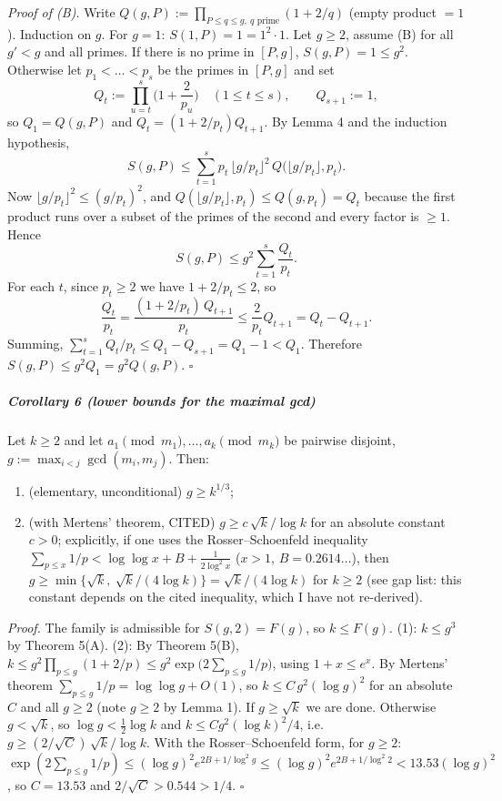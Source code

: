 \emph{Proof of (B).} Write
\(Q(g,P):=\prod_{P\le q\le g,\ q\text{ prime}}(1+2/q)\) (empty product
\(=1\)). Induction on \(g\). For \(g=1\): \(S(1,P)=1=1^2\cdot 1\). Let
\(g\ge2\), assume (B) for all \(g'<g\) and all primes. If there is no
prime in \([P,g]\), \(S(g,P)=1\le g^2\). Otherwise let \(p_1<\dots<p_s\)
be the primes in \([P,g]\) and set
\[Q_t:=\prod_{u=t}^{s}\Big(1+\frac2{p_u}\Big)\quad(1\le t\le s),\qquad Q_{s+1}:=1,\]
so \(Q_1=Q(g,P)\) and \(Q_t=(1+2/p_t)Q_{t+1}\). By Lemma 4 and the
induction hypothesis,
\[S(g,P)\le\sum_{t=1}^{s}p_t\,\lfloor g/p_t\rfloor^{2}\,Q\big(\lfloor g/p_t\rfloor,p_t\big).\]
Now \(\lfloor g/p_t\rfloor^2\le (g/p_t)^2\), and
\(Q(\lfloor g/p_t\rfloor,p_t)\le Q(g,p_t)=Q_t\) because the first
product runs over a subset of the primes of the second and every factor
is \(\ge1\). Hence \[S(g,P)\le g^{2}\sum_{t=1}^{s}\frac{Q_t}{p_t}.\] For
each \(t\), since \(p_t\ge2\) we have \(1+2/p_t\le 2\), so
\[\frac{Q_t}{p_t}=\frac{(1+2/p_t)\,Q_{t+1}}{p_t}\le\frac{2}{p_t}Q_{t+1}=Q_t-Q_{t+1}.\]
Summing, \(\sum_{t=1}^{s}Q_t/p_t\le Q_1-Q_{s+1}=Q_1-1<Q_1\). Therefore
\(S(g,P)\le g^2Q_1=g^2Q(g,P)\). \(\square\)

\subparagraph{Corollary 6 (lower bounds for the maximal
gcd)}\label{corollary-6-lower-bounds-for-the-maximal-gcd}

Let \(k\ge2\) and let \(a_1\pmod{m_1},\dots,a_k\pmod{m_k}\) be pairwise
disjoint, \(g:=\max_{i<j}\gcd(m_i,m_j)\). Then:

\begin{enumerate}
\def\labelenumi{\arabic{enumi}.}
\tightlist
\item
  (elementary, unconditional) \(g\ge k^{1/3}\);
\item
  (with Mertens' theorem, CITED) \(g\ge c\,\sqrt{k}/\log k\) for an
  absolute constant \(c>0\); explicitly, if one uses the
  Rosser--Schoenfeld inequality
  \(\sum_{p\le x}1/p<\log\log x+B+\frac{1}{2\log^2 x}\) (\(x>1\),
  \(B=0.2614\ldots\)), then
  \(g\ge\min\{\sqrt k,\ \sqrt k/(4\log k)\}=\sqrt k/(4\log k)\) for
  \(k\ge 2\) (see gap list: this constant depends on the cited
  inequality, which I have not re-derived).
\end{enumerate}

\emph{Proof.} The family is admissible for \(S(g,2)=F(g)\), so
\(k\le F(g)\). (1): \(k\le g^3\) by Theorem 5(A). (2): By Theorem 5(B),
\(k\le g^2\prod_{p\le g}(1+2/p)\le g^2\exp\big(2\sum_{p\le g}1/p\big)\),
using \(1+x\le e^x\). By Mertens' theorem
\(\sum_{p\le g}1/p=\log\log g+O(1)\), so \(k\le C\,g^2(\log g)^2\) for
an absolute \(C\) and all \(g\ge2\) (note \(g\ge2\) by Lemma 1). If
\(g\ge\sqrt k\) we are done. Otherwise \(g<\sqrt k\), so
\(\log g<\tfrac12\log k\) and \(k\le C g^2(\log k)^2/4\),
i.e.~\(g\ge (2/\sqrt C)\,\sqrt k/\log k\). With the Rosser--Schoenfeld
form, for \(g\ge2\):
\(\exp(2\sum_{p\le g}1/p)\le (\log g)^2 e^{2B+1/\log^2 g}\le (\log g)^2e^{2B+1/\log^2 2}<13.53(\log g)^2\),
so \(C=13.53\) and \(2/\sqrt{C}>0.544>1/4\). \(\square\)

